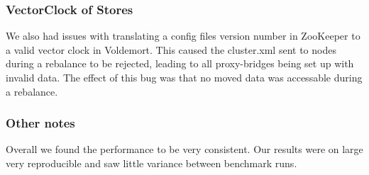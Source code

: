 \subsubsection{VectorClock of Stores}
We also had issues with translating a config files version number in ZooKeeper to a valid vector clock in Voldemort. This caused the cluster.xml sent to nodes during a rebalance to be rejected, leading to all proxy-bridges being set up with invalid data. The effect of this bug was that no moved data was accessable during a rebalance. 

\subsubsection{Other notes}
Overall we found the performance to be very consistent. Our results were on large very reproducible and saw little variance between benchmark runs.
